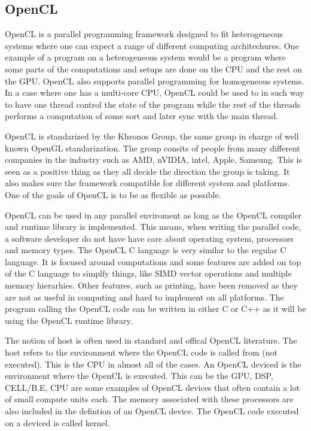 \subsection{OpenCL}

OpenCL is a parallel programming framework designed to fit heterogeneous systems where one can expect a range of different computing architechures. One example of a program on a heterogeneous system would be a program where some parts of the computations and setups are done on the CPU and the rest on the GPU. OpenCL also supports parallel programming for homogeneous systems. In a case where one has a multi-core CPU, OpenCL could be used to in such way to have one thread control the state of the program while the rest of the threads performs a computation of some sort and later sync with the main thread.
\newline

OpenCL is standarized by the Khronos Group, the same group in charge of well known OpenGL standarization. The group consits of people from many different companies in the industry such as AMD, nVIDIA, intel, Apple, Samsung. This is seen as a positive thing as they all decide the direction the group is taking. It also makes sure the framework compatible for different system and platforms. One of the goals of OpenCL is to be as flexible as possible.
\newline

OpenCL can be used in any parallel enviroment as long as the OpenCL compiler and runtime library is implemented. This means, when writing the parallel code, a software developer do not have have care about operating system, processors and memory types. The OpenCL C language is very similar to the regular C language. It is focused around computations and some features are added on top of the C language to simplfy things, like SIMD vector operations and multiple memory hierarhies. Other features, such as printing, have been removed as they are not as useful in computing and hard to implement on all platforms. The program calling the OpenCL code can be written in either C or C++ as it will be using the OpenCL runtime library. 
\newline

The notion of host is often used in standard and offical OpenCL literature. The host refers to the environment where the OpenCL code is called from (not executed). This is the CPU in almost all of the cases. An OpenCL deviced is the environment where the OpenCL is executed. This can be the GPU, DSP, CELL/B.E, CPU are some examples of OpenCL devices that often contain a lot of small compute units each. The memory associated with these processors are also included in the defintion of an OpenCL device. The OpenCL code executed on a deviced is called kernel.
\newline

